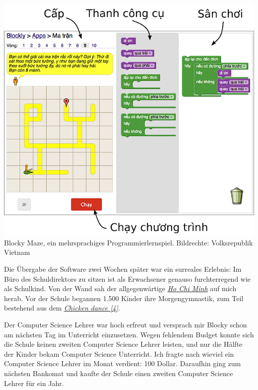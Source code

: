 \begin{center}
\includegraphics[width=\linewidth]{vietnam/vietnam_blocky.png}
\footnotesize{Blocky Maze, ein mehrsprachiges Programmierlernspiel. Bildrechte: Volksrepublik Vietnam}
\end{center}

Die Übergabe der Software zwei Wochen später war ein surreales Erlebnis: Im Büro des Schuldirektors zu sitzen ist als Erwachsener genauso furchterregend wie als Schulkind. Von der Wand sah der allgegenwärtige \href{http://goo.gl/fZATT3}{\textit{Ho Chi Minh}} auf mich herab. Vor der Schule begannen 1.500 Kinder ihre Morgengymnastik, zum Teil bestehend aus dem \href{http://www.youtube.com/watch?v=4xmV5uHWNag}{\textit{Chicken dance [4]}}.

Der Computer Science Lehrer war hoch erfreut und versprach mir Blocky schon am nächsten Tag im Unterricht einzusetzen. Wegen fehlendem Budget konnte sich die Schule keinen zweiten Computer Science Lehrer leisten, und nur die Hälfte der Kinder bekam Computer Science Unterricht. Ich fragte nach wieviel ein Computer Science Lehrer im Monat verdient: 100 Dollar. Daraufhin ging zum nächsten Bankomat und kaufte der Schule einen zweiten Computer Science Lehrer für ein Jahr.

